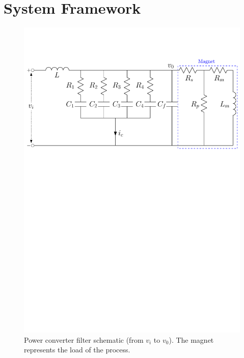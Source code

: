 \documentclass[a4paper, 10pt, conference]{ieeeconf}
\begin{document}
\section{System Framework}
\label{sec:system}
\begin{figure}
\centering
\includegraphics[width=\columnwidth]{../pics/circuit_partial_a}
\caption{Power converter filter schematic (from $v_i$ to $v_0$). The magnet represents the load of the process.}
\label{fig:circuit}
\end{figure}
\end{document}
